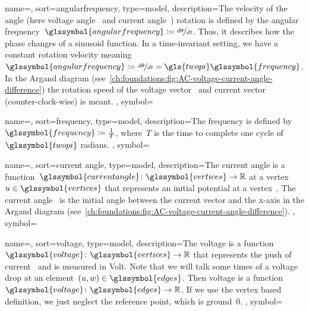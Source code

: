 {
    name={\angularfrequency},
    sort={angularfrequency},
    type={model},
    description={The velocity of the angle (here voltage
    angle~ and current angle~)
    rotation is defined by the angular
    frequency~$\glssymbol{angularfrequency}\coloneqq\nicefrac{d\aangle}{d\timestamp}$.
    Thus, it describes how the phase changes of a sinusoid function. In a
    time-invariant setting, we have a constant rotation velocity
    meaning~$\glssymbol{angularfrequency}\coloneqq\nicefrac{d\aangle} {d\timestamp} =
    \gls{twopi}\glssymbol{frequency}$. In the Argand diagram
    (see~\cref{ch:foundations:fig:AC-voltage-current-angle-difference}) the
    rotation speed of the voltage vector~ and current
    vector~ (counter-clock-wise) is meant.
    },
    symbol={\angularfrequency}
}

{
    name={\frequency},
    sort={frequency},
    type={model},
    description={The frequency is defined
    by~$\glssymbol{frequency}\coloneqq\frac{1}{T}$, where~$T$ is the time to
    complete one cycle of~$\glssymbol{twopi}$ radians.
    },
    symbol={\frequency}
}

{
    name={\iangle},
    sort={current angle},
    type={model},
    description={The current angle is a
    function~$\glssymbol{currentangle}\colon\glssymbol{vertices}\to\reals$ at a
    vertex~$\vertexa\in\glssymbol{vertices}$ that represents an initial
    potential at a vertex~\vertexa. The current angle~
    is the initial angle between the current vector and the x-axis in the Argand
    diagram (see~\cref{ch:foundations:fig:AC-voltage-current-angle-difference}).
    },
    symbol={\iangle}
}

{
    name={\voltage},
    sort={voltage},
    type={model},
    description={The voltage is a
    function~$\glssymbol{voltage}\colon\glssymbol{vertices}\to\reals$ that
    represents the push of current~ and is measured in Volt.
    Note that we will talk some times of a voltage drop at an
    element~$(\vertexa,\vertexc)\in\glssymbol{edges}$. Then voltage is a
    function~$\glssymbol{voltage}\colon\glssymbol{edges}\to\reals$. If we use
    the vertex based definition, we just neglect the reference point, which is
    ground~$0$.
    },
    symbol={\voltage}
}

